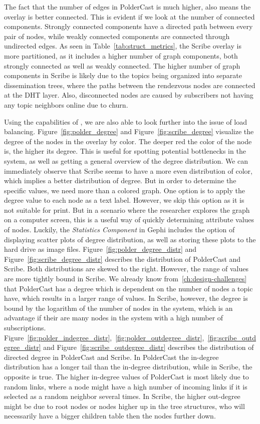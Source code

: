 The fact that the number of edges in PolderCast is much higher, also
means the overlay is better connected. This is evident if we look at the
number of connected components. Strongly connected components have a
directed path between every pair of nodes, while weakly connected
components are connected through undirected edges. As seen in
Table~\ref{tab:struct_metrics}, the Scribe overlay is more partitioned,
as it includes a higher number of graph components, both strongly
connected as well as weakly connected. The higher number of graph
components in Scribe is likely due to the topics being organized into
separate dissemination trees, where the paths between the rendezvous
nodes are connected at the DHT layer. Also, disconnected nodes are
caused by subscribers not having any topic neighbors online due to
churn.

Using the capabilities of \demo{}, we are also able to look further into
the issue of load balancing. Figure~\ref{fig:polder_degree} and
Figure~\ref{fig:scribe_degree} visualize the degree of the nodes in the
overlay by color. The deeper red the color of the node is, the higher
its degree. This is useful for spotting potential bottlenecks in the
system, as well as getting a general overview of the degree
distribution. We can immediately observe that Scribe seems to have a
more even distribution of color, which implies a better distribution of
degree. But in order to determine the specific values, we need more than
a colored graph. One option is to apply the degree value to each node as
a text label. However, we skip this option as it is not suitable for
print. But in a scenario where the researcher explores the graph on a
computer screen, this is a useful way of quickly determining attribute
values of nodes. Luckily, the \emph{Statistics Component} in Gephi
includes the option of displaying scatter plots of degree distribution,
as well as storing these plots to the hard drive as image files.
Figure~\ref{fig:polder_degree_distr} and
Figure~\ref{fig:scribe_degree_distr} describes the distribution of
PolderCast and Scribe. Both distributions are skewed to the right.
However, the range of values are more tightly bound in Scribe. We
already know from~\ref{ch:design-challenges} that PolderCast has a
degree which is dependent on the number of nodes a topic have, which
results in a larger range of values. In Scribe, however, the degree is
bound by the logarithm of the number of nodes in the system, which is an
advantage if their are many nodes in the system with a high number of
subscriptions.
Figure~\ref{fig:polder_indegree_distr},~\ref{fig:polder_outdegree_distr},~\ref{fig:scribe_outdegree_distr}
and Figure~\ref{fig:scribe_outdegree_distr} describes the distribution
of directed degree in PolderCast and Scribe. In PolderCast the in-degree
distribution has a longer tail than the in-degree distribution, while in
Scribe, the opposite is true. The higher in-degree values of PolderCast
is most likely due to random links, where a node might have a high
number of incoming links if it is selected as a random neighbor several
times. In Scribe, the higher out-degree might be due to root nodes or
nodes higher up in the tree structures, who will necessarily have a
bigger children table then the nodes further down.

